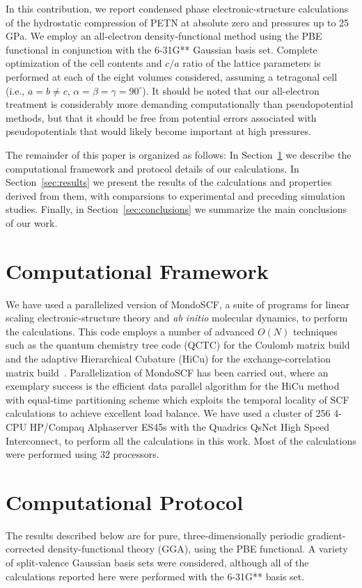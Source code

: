 \documentclass[prb,aps,nobibnotes,twocolumn,doublespace,twocolumngrid,superbib]{revtex4}
\begin{document}
In this contribution, we report condensed phase electronic-structure
calculations of the hydrostatic compression of PETN at absolute zero
and pressures up to 25 GPa.  We employ an all-electron density-functional 
method using the PBE functional in conjunction with the 6-31G** Gaussian basis 
set.   Complete optimization of the cell contents and $c/a$ ratio of the 
lattice 
parameters is performed at each of the eight volumes considered, assuming 
a tetragonal cell (i.e., $a=b \neq c$, $\alpha=\beta=\gamma=90^\circ$).
It should be noted that our all-electron treatment is considerably more
demanding computationally than pseudopotential methods, but that it should
be free from potential errors associated with pseudopotentials that would
likely become important at high pressures.

The remainder of this paper is organized as follows: In
Section~\ref{sec:comput} we describe the computational framework and
protocol details of our calculations. In Section~\ref{sec:results} we 
present the results of the calculations and properties derived from them,
with comparsions to experimental and preceding simulation studies. 
Finally, in Section~\ref{sec:conclusions} we summarize the main conclusions
of our work.

\section{Computational Framework}
\label{sec:comput}
We have used a parallelized version of MondoSCF\cite{MondoSCF}, 
a suite of programs
for linear scaling electronic-structure theory and 
{\it ab initio} molecular dynamics, to perform the calculations.  This code employs a
number of advanced $O(N)$ techniques such as the quantum chemistry tree code
(QCTC) for the Coulomb matrix build
\cite{MChallacombe96,MChallacombe96B,MChallacombe97} and
the adaptive Hierarchical Cubature (HiCu) for the exchange-correlation 
matrix build~\cite{MChallacombe00A}. Parallelization of MondoSCF
has been carried out, where an exemplary success is 
the efficient data parallel algorithm for the
HiCu method\cite{CGan03} with equal-time partitioning scheme
which exploits the temporal locality of SCF 
calculations to achieve excellent load
balance. We have
used a cluster of 256 4-CPU HP/Compaq Alphaserver ES45s with the
Quadrics QsNet High Speed Interconnect, to perform all the calculations 
in this work.   Most of the calculations were performed using 32 
processors.

\section{Computational Protocol}
\label{sec:protocol}
The results described below are for pure, three-dimensionally periodic 
gradient-corrected density-functional theory (GGA), using the PBE
functional\cite{Perdew_96v77}. A variety of split-valence Gaussian
basis sets were considered, although all of the calculations reported
here were performed with the 6-31G** basis set. 
\end{document}
